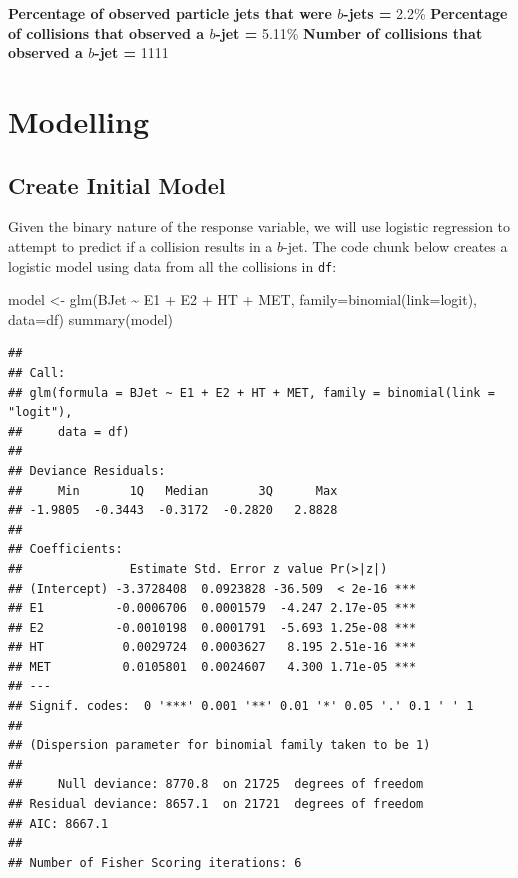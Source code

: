 \documentclass[
]{article}
\newenvironment{Shaded}{\begin{snugshade}}{\end{snugshade}}
\newcommand{\AttributeTok}[1]{\textcolor[rgb]{0.77,0.63,0.00}{#1}}
\newcommand{\FunctionTok}[1]{\textcolor[rgb]{0.00,0.00,0.00}{#1}}
\newcommand{\NormalTok}[1]{#1}
\newcommand{\OtherTok}[1]{\textcolor[rgb]{0.56,0.35,0.01}{#1}}
\newcommand{\SpecialCharTok}[1]{\textcolor[rgb]{0.00,0.00,0.00}{#1}}
\newcommand{\StringTok}[1]{\textcolor[rgb]{0.31,0.60,0.02}{#1}}
\begin{document}
\textbf{Percentage of observed particle jets that were \(b\)-jets =}
2.2\% \textbf{Percentage of collisions that observed a \(b\)-jet =}
5.11\% \textbf{Number of collisions that observed a \(b\)-jet = } 1111

\hypertarget{modelling}{%
\section{Modelling}\label{modelling}}

\hypertarget{create-initial-model}{%
\subsection{Create Initial Model}\label{create-initial-model}}

Given the binary nature of the response variable, we will use logistic
regression to attempt to predict if a collision results in a \(b\)-jet.
The code chunk below creates a logistic model using data from all the
collisions in \texttt{df}:

\begin{Shaded}
\begin{Highlighting}[]
\NormalTok{model }\OtherTok{\textless{}{-}} \FunctionTok{glm}\NormalTok{(BJet }\SpecialCharTok{\textasciitilde{}}\NormalTok{ E1 }\SpecialCharTok{+}\NormalTok{ E2 }\SpecialCharTok{+}\NormalTok{ HT }\SpecialCharTok{+}\NormalTok{ MET, }\AttributeTok{family=}\FunctionTok{binomial}\NormalTok{(}\AttributeTok{link=}\StringTok{\textquotesingle{}logit\textquotesingle{}}\NormalTok{), }\AttributeTok{data=}\NormalTok{df)}
\FunctionTok{summary}\NormalTok{(model)}
\end{Highlighting}
\end{Shaded}

\begin{verbatim}
## 
## Call:
## glm(formula = BJet ~ E1 + E2 + HT + MET, family = binomial(link = "logit"), 
##     data = df)
## 
## Deviance Residuals: 
##     Min       1Q   Median       3Q      Max  
## -1.9805  -0.3443  -0.3172  -0.2820   2.8828  
## 
## Coefficients:
##               Estimate Std. Error z value Pr(>|z|)    
## (Intercept) -3.3728408  0.0923828 -36.509  < 2e-16 ***
## E1          -0.0006706  0.0001579  -4.247 2.17e-05 ***
## E2          -0.0010198  0.0001791  -5.693 1.25e-08 ***
## HT           0.0029724  0.0003627   8.195 2.51e-16 ***
## MET          0.0105801  0.0024607   4.300 1.71e-05 ***
## ---
## Signif. codes:  0 '***' 0.001 '**' 0.01 '*' 0.05 '.' 0.1 ' ' 1
## 
## (Dispersion parameter for binomial family taken to be 1)
## 
##     Null deviance: 8770.8  on 21725  degrees of freedom
## Residual deviance: 8657.1  on 21721  degrees of freedom
## AIC: 8667.1
## 
## Number of Fisher Scoring iterations: 6
\end{verbatim}
\end{document}
